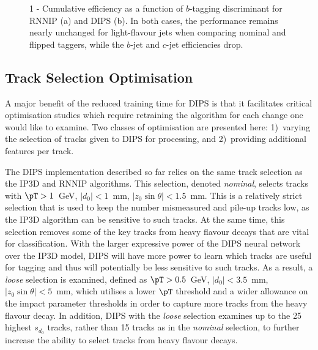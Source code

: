 \begin{figure}[htpb!]
    \centering
    \caption{1 - Cumulative efficiency as a function of $b$-tagging discriminant for RNNIP (a) and DIPS (b). In both cases, the performance remains nearly unchanged for light-flavour jets when comparing nominal and flipped taggers, while the $b$-jet and $c$-jet efficiencies drop.}
    \label{fig:rocFlippedTaggers}
\end{figure}

\subsection{Track Selection Optimisation}
\label{subsec:optimisation}

A major benefit of the reduced training time for DIPS is that it facilitates critical optimisation studies which require retraining the algorithm for each change one would like to examine. %
Two classes of optimisation are presented here: 1)~varying the selection of tracks given to DIPS for processing, and 2)~providing additional features per track. 

The DIPS implementation described so far relies on the same track selection as the IP3D and RNNIP algorithms. This selection, denoted \textit{nominal}, selects tracks with  
$\pT >1$~GeV, $|d_0|<1$~mm, ${|z_0 \sin \theta|<1.5}$~mm. This is a relatively strict selection that is used to keep the number mismeasured and pile-up tracks low, as the IP3D algorithm can be sensitive to such tracks. At the same time, this selection removes some of the key tracks from heavy flavour decays that are vital for classification. With the larger expressive power of the DIPS neural network over the IP3D model, DIPS will have more power to learn which tracks are useful for tagging and thus will potentially be less sensitive to such tracks. As a result, a \textit{loose} selection is examined, defined as $\pT >0.5$~GeV, $|d_0|<3.5$~mm, $|z_0 \sin \theta|<5$~mm, which utilises a lower $\pT$ threshold and a wider allowance on the impact parameter thresholds in order to capture more tracks from the heavy flavour decay. In addition, DIPS with the  \textit{loose} selection examines up to the 25 highest $s_{d_{0}}$ tracks, rather than 15 tracks as in the  \textit{nominal} selection, to further increase the ability to select tracks from heavy flavour decays. 

